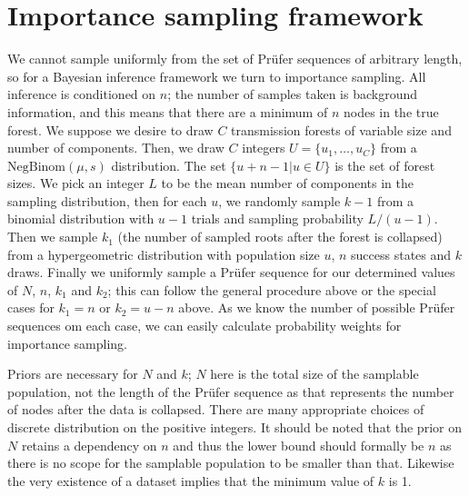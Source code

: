 \documentclass{article}
\newcommand{\prufer}{Pr{\"u}fer }
\begin{document}
\section{Importance sampling framework}

We cannot sample uniformly from the set of \prufer sequences of arbitrary length, so for a Bayesian inference framework we turn to importance sampling. All inference is conditioned on $n$; the number of samples taken is background information, and this means that there are a minimum of $n$ nodes in the true forest. We suppose we desire to draw $C$ transmission forests of variable size and number of components.  Then, we draw $C$ integers $U=\{u_1,\ldots,u_C\}$ from a $\mathrm{NegBinom}(\mu, s)$ distribution. The set $\{u+n-1 | u \in U\}$ is the set of forest sizes. We pick an integer $L$ to be the mean number of components in the sampling distribution, then for each $u$, we randomly sample $k-1$ from a binomial distribution with $u-1$ trials and sampling probability $L/(u-1)$. Then we sample $k_1$ (the number of sampled roots after the forest is collapsed) from a hypergeometric distribution with population size $u$, $n$ success states and $k$ draws. Finally we uniformly sample a \prufer sequence for our determined values of $N$, $n$, $k_1$ and $k_2$; this can follow the general procedure above or the special cases for $k_1=n$ or $k_2=u-n$ above. As we know the number of possible \prufer sequences om each case, we can easily calculate probability weights for importance sampling.

Priors are necessary for $N$ and $k$; $N$ here is the total size of the samplable population, not the length of the \prufer sequence as that represents the number of nodes after the data is collapsed. There are many appropriate choices of discrete distribution on the positive integers. It should be noted that the prior on $N$ retains a dependency on $n$ and thus the lower bound should formally be $n$ as there is no scope for the samplable population to be smaller than that. Likewise the very existence of a dataset implies that the minimum value of $k$ is 1.


\printbibliography
\end{document}
